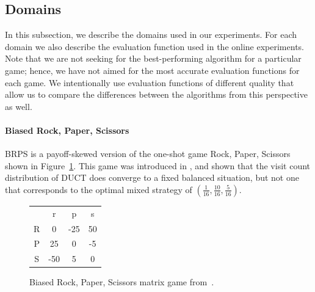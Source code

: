 \subsection{Domains}\label{sec:eval:domains}

In this subsection, we describe the domains used in our experiments.
For each domain we also describe the evaluation function used in the online experiments. 
Note that we are not seeking for the best-performing algorithm for a particular game; hence, we have not aimed for the most accurate evaluation functions for each game.
We intentionally use evaluation functions of different quality that allow us to compare the differences between the algorithms from this perspective as well.

\paragraph{\textbf{Biased Rock, Paper, Scissors}} 
BRPS is a payoff-skewed version of the one-shot game Rock, Paper, Scissors shown in 
Figure~\ref{fig:brps}. This game was introduced in \cite{Shafiei09}, and shown that the visit count distribution of 
DUCT does converge to a fixed balanced situation, but not one that 
corresponds to the optimal mixed strategy of $(\frac{1}{16},\frac{10}{16},\frac{5}{16})$. 

\begin{figure}[h!]
\begin{center}
\begin{tabular}{c|c|c|c|}
 \multicolumn{1}{c}{~} & \multicolumn{1}{c}{r}  &  \multicolumn{1}{c}{p} &  \multicolumn{1}{c}{s}\\\cline{2-4}
R &  0  & -25& 50\\\cline{2-4}
P &  25 &  0 & -5\\\cline{2-4}
S & -50 &  5 &  0\\\cline{2-4}
\end{tabular}
\end{center}
\caption{Biased Rock, Paper, Scissors matrix game from~\cite{Shafiei09}. \label{fig:brps}}
\end{figure}

